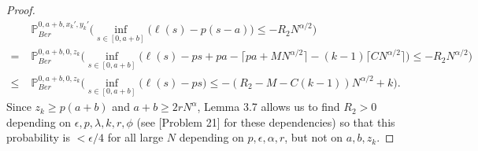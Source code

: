 \documentclass[12pt]{article}
\begin{document}
\begin{proof}
\begin{align*}
		& \mathbb{P}^{0, a+b, x_k', y_k'}_{Ber} \Big( \inf_{s\in[0,a+b]} \big(\ell(s) - p(s-a)\big) \leq -R_2 N^{\alpha/2} \Big)\\
		= \; & \mathbb{P}^{0, a+b, 0, z_k}_{Ber} \Big( \inf_{s\in[0,a+b]} \big(\ell(s) - ps + pa - \lceil pa + MN^{\alpha/2}\rceil - (k-1)\lceil CN^{\alpha/2}\rceil\big) \leq -R_2 N^{\alpha/2} \Big)\\
		\leq \; & \mathbb{P}^{0, a+b, 0, z_k}_{Ber} \Big( \inf_{s\in[0,a+b]} \big(\ell(s) - ps\big) \leq -(R_2 - M - C(k-1)) N^{\alpha/2} + k \Big).
		\end{align*}
		Since $z_k\geq p(a+b)$ and $a+b \geq 2rN^\alpha$, Lemma 3.7 allows us to find $R_2>0$ depending on $\epsilon,p,\lambda,k,r,\phi$ (see [Problem 21] for these dependencies) so that this probability is $<\epsilon/4$ for all large $N$ depending on $p,\epsilon,\alpha,r$, but not on $a,b,z_k$.
		

\end{proof}
\end{document}
